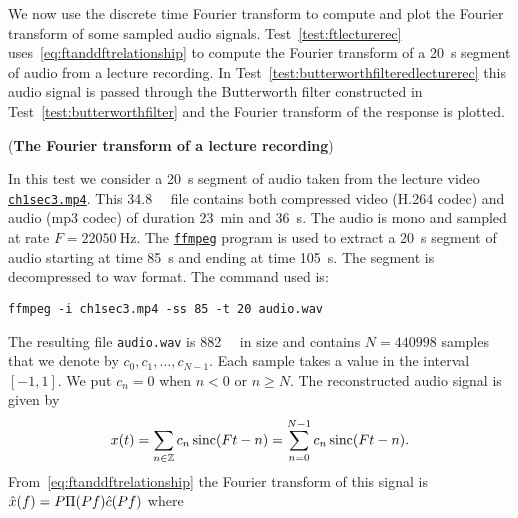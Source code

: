We now use the discrete time Fourier transform to compute and plot the Fourier transform of some sampled audio signals.  Test~\ref{test:ftlecturerec} uses~\eqref{eq:ftanddftrelationship} to compute the Fourier transform of a \SI{20}{\second} segment of audio from a lecture recording.  In Test~\ref{test:butterworthfilteredlecturerec} this audio signal is passed through the Butterworth filter constructed in Test~\ref{test:butterworthfilter} and the Fourier transform of the response is plotted.

\begin{test}\label{test:ftlecturerec}
(\textbf{The Fourier transform of a lecture recording})

In this test we consider a \SI{20}{\second} segment of audio taken from the lecture video \href{www.itr.unisa.edu.au/~mckillrg/videos/lectures/signalsandsystems2014/ch1sec3.mp4}{\texttt{ch1sec3.mp4}}.  
This \SI{34.8}{\mega\byte} file contains both compressed video (H.264 codec) and audio (mp3 codec) of duration \SI{23}{\minute} and \SI{36}{\second}.  The audio is mono and sampled at rate $F = \SI{22050}{\hertz}$.  The \href{https://www.ffmpeg.org/}{\texttt{ffmpeg}} program is used to extract a \SI{20}{\second} segment of audio starting at time \SI{85}{\second} and ending at time \SI{105}{\second}.  The segment is decompressed to wav format.  The command used is:
\begin{center}
\parbox[][][c]{10cm}{
\texttt{ffmpeg -i ch1sec3.mp4 -ss 85 -t 20 audio.wav}
}
\end{center}
The resulting file \texttt{audio.wav} is \SI{882}{\kilo\byte} in size and contains $N = 440998$ samples that we denote by $c_0,c_1,\dots,c_{N-1}$.  Each sample takes a value in the interval $[-1,1]$.  We put $c_n = 0$ when $n < 0$ or $n \geq N$.  The reconstructed audio signal is given by
\[
x(t) = \sum_{n \in {\mathbb Z}} c_n \operatorname{sinc}(Ft - n) = \sum_{n=0}^{N-1} c_n \operatorname{sinc}(Ft - n).
\]
From~\eqref{eq:ftanddftrelationship} the Fourier transform of this signal is $\hat{x}(f) = P \Pi(P f) \hat{c}(Pf)$ where 
\begin{equation}\label{eq:dftsumNterms}

\end{equation}
\end{test}
